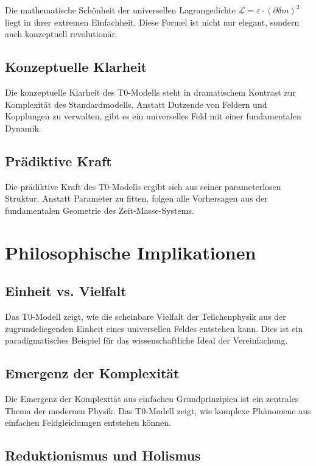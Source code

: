 \documentclass[12pt,a4paper]{report}
\begin{document}
	Die mathematische Schönheit der universellen Lagrangedichte $\mathcal{L} = \varepsilon \cdot (\partial\delta m)^2$ liegt in ihrer extremen Einfachheit. Diese Formel ist nicht nur elegant, sondern auch konzeptuell revolutionär.
	
	\subsection{Konzeptuelle Klarheit}
	
	Die konzeptuelle Klarheit des T0-Modells steht in dramatischem Kontrast zur Komplexität des Standardmodells. Anstatt Dutzende von Feldern und Kopplungen zu verwalten, gibt es ein universelles Feld mit einer fundamentalen Dynamik.
	
	\subsection{Prädiktive Kraft}
	
	Die prädiktive Kraft des T0-Modells ergibt sich aus seiner parameterlosen Struktur. Anstatt Parameter zu fitten, folgen alle Vorhersagen aus der fundamentalen Geometrie des Zeit-Masse-Systems.
	
	\section{Philosophische Implikationen}
	
	\subsection{Einheit vs. Vielfalt}
	
	Das T0-Modell zeigt, wie die scheinbare Vielfalt der Teilchenphysik aus der zugrundeliegenden Einheit eines universellen Feldes entstehen kann. Dies ist ein paradigmatisches Beispiel für das wissenschaftliche Ideal der Vereinfachung.
	
	\subsection{Emergenz der Komplexität}
	
	Die Emergenz der Komplexität aus einfachen Grundprinzipien ist ein zentrales Thema der modernen Physik. Das T0-Modell zeigt, wie komplexe Phänomene aus einfachen Feldgleichungen entstehen können.
	
	\subsection{Reduktionismus und Holismus}
	
\end{document}
